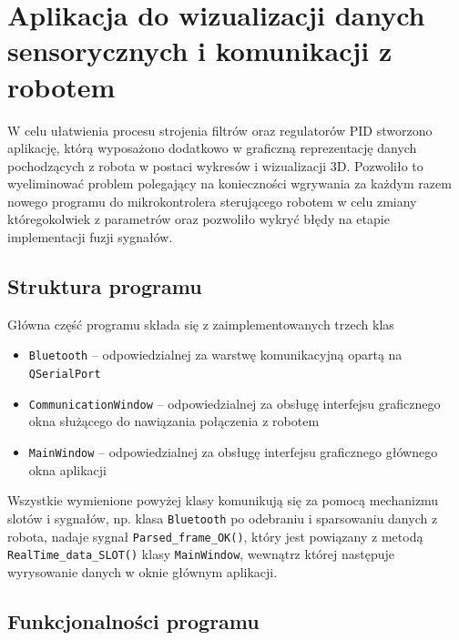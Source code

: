 \chapter{Aplikacja do wizualizacji danych sensorycznych i komunikacji z robotem}
\label{chap:aplikacja}

W celu ułatwienia procesu strojenia filtrów oraz regulatorów PID stworzono aplikację, którą wyposażono dodatkowo w graficzną reprezentację danych pochodzących z robota w postaci wykresów i wizualizacji 3D. Pozwoliło to wyeliminować problem polegający na konieczności wgrywania za każdym razem nowego programu do mikrokontrolera sterującego robotem w celu zmiany któregokolwiek z parametrów oraz pozwoliło wykryć błędy na etapie implementacji fuzji sygnałów.

\section{Struktura programu}

Główna część programu składa się z zaimplementowanych trzech klas
\begin{itemize}
    \item \texttt{Bluetooth} -- odpowiedzialnej za warstwę komunikacyjną opartą na \texttt{QSerialPort}
    \item \texttt{CommunicationWindow} -- odpowiedzialnej za obsługę interfejsu graficznego okna służącego do nawiązania połączenia z robotem
    \item \texttt{MainWindow} -- odpowiedzialnej za obsługę interfejsu graficznego głównego okna aplikacji
\end{itemize}

Wszystkie wymienione powyżej klasy komunikują się za pomocą mechanizmu slotów i sygnałów, np. klasa \texttt{Bluetooth} po odebraniu i sparsowaniu danych z robota, nadaje sygnał \texttt{Parsed\_frame\_OK()}, który jest powiązany z metodą \texttt{RealTime\_data\_SLOT()} klasy \texttt{MainWindow}, wewnątrz której następuje wyrysowanie danych w oknie głównym aplikacji. 
\section{Funkcjonalności programu}

